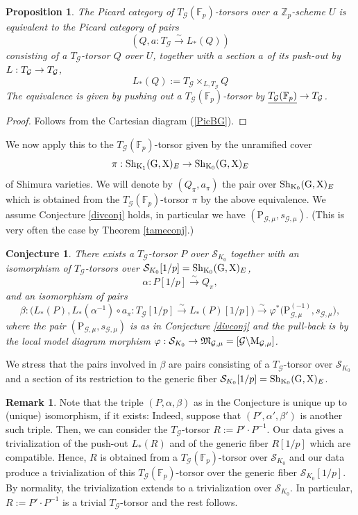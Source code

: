 \documentclass[reqno, 10pt]{amsart}
\makeatletter
\newcommand{\fkM}{\ensuremath{\mathfrak{M}}\xspace}
\newcommand{\BF}{\ensuremath{\mathbb {F}}\xspace}
\newcommand{\BZ}{\ensuremath{\mathbb {Z}}\xspace}
\newcommand{\CG}{\ensuremath{\mathcal {G}}\xspace}
\newcommand{\CS}{\ensuremath{\mathcal {S}}\xspace}
\newcommand{\RG}{\ensuremath{\mathrm {G}}\xspace}
\newcommand{\RK}{\ensuremath{\mathrm {K}}\xspace}
\newcommand{\RP}{\ensuremath{\mathrm {P}}\xspace}
\newcommand{\RX}{\ensuremath{\mathrm {X}}\xspace}
\newcommand{\bs}{\backslash}
\newtheorem{proposition}[subsubsection]{Proposition}
\newtheorem {conjecture}[subsubsection]{Conjecture}
\theoremstyle{definition}
\newtheorem{remark}[subsubsection]{Remark}
\numberwithin{equation}{subsection}
\numberwithin{subsubsection}{subsection}
\renewcommand{\to}{%
   \ifbool{@display}{\longrightarrow}{\rightarrow}%
   }
\newcommand{\und}{\underline}
\newcommand{\Mloc}{{\rm M}}
\makeatother
\begin{document}
 \begin{proposition}\label{prop:torsors}
 The Picard category of $T_\CG(\BF_p)$-torsors over a $\BZ_p$-scheme $U$ is equivalent to the Picard category of pairs 
 \[
 (Q, a: T_{\CG}\xrightarrow{\sim}  L_*(Q))
 \]
consisting of a $T_{\CG}$-torsor $Q$ over $U$, together with a section $a$ of its push-out by $L: T_{\CG}\to T_{\CG}$,
 \[
 L_*(Q):=T_{\CG}\times_{L, T_{\CG}}Q
 \]
The equivalence is given by pushing out a $T_\CG(\BF_p)$-torsor by $\und{T_\CG(\BF_p)}\to T_{\CG}$. 
\end{proposition}

\begin{proof}
Follows from the Cartesian diagram (\ref{PicBG}).
\end{proof}


We now apply this to the $T_\CG(\BF_p)$-torsor given by the unramified cover
  \[
 \pi: {\rm Sh}_{\RK_1 }(\RG, \RX)_E\to {\rm Sh}_{\RK_0}(\RG, \RX)_E
 \]
 of Shimura varieties. We will denote by $(Q_\pi, a_\pi)$ the pair over ${\rm Sh}_{\RK_0}(\RG, \RX)_E$ which is obtained  from the $T_\CG(\BF_p)$-torsor  $\pi$ by the above equivalence.  We assume Conjecture \ref{divconj} holds, in particular we have $(\RP_{\CG,\mu}, s_{\CG,\mu})$. (This is very often the case by Theorem \ref{tameconj}.)
  
 \begin{conjecture}\label{conj:torsors}
 There exists a $T_\CG$-torsor $P$ over $\CS_{K_0}$ together with an isomorphism of $T_\CG$-torsors over 
 $\CS_{K_0}[1/p]={\rm Sh}_{\RK_0}(\RG, \RX)_E$,
 \[
 \alpha: P[1/p]\xrightarrow{\sim} Q_\pi,
 \]
  and an isomorphism of pairs 
 \[
 \beta: \big(L_*(P), L_*(\alpha^{-1})\circ a_\pi: T_{\CG}[1/p]\xrightarrow{\sim} L_*(P)[1/p]\big)\xrightarrow{\sim} \varphi^*\big(\RP^{(-1)}_{\CG,\mu}, s_{\CG,\mu}\big),
 \]
 where the pair  $(\RP_{\CG,\mu}, s_{\CG,\mu})$ is as in Conjecture \ref{divconj} and the pull-back is by the local model diagram morphism $\varphi: \CS_{K_0}\to \fkM_{\CG,\mu}
 =[\CG\bs \Mloc_{\CG,\mu}]$.
 \end{conjecture}
 
We stress that the pairs involved in $\beta$ are pairs consisting of a $T_\CG$-torsor over $\CS_{K_0}$ and  a section of its restriction to the generic fiber $\CS_{K_0}[1/p]={\rm Sh}_{\RK_0}(\RG, \RX)_E$. 

\begin{remark}
Note that  the triple $(P,\alpha,\beta)$ as in the Conjecture is unique up to (unique) isomorphism, if it exists: Indeed, suppose that $(P',\alpha',\beta')$ is another such triple.
Then, we can consider the $T_\CG$-torsor $R:=P'\cdot P^{-1}$. Our data gives a trivialization of the push-out $L_*(R)$ and of the generic fiber $R[1/p]$ which are compatible. Hence, $R$ is obtained from a $T_\CG(\BF_p)$-torsor over $\CS_{K_0}$ and our data produce a trivialization of this $T_\CG(\BF_p)$-torsor over the generic fiber $\CS_{K_0}[1/p]$. By normality, the trivialization extends to a trivialization over $\CS_{K_0}$. In particular, $R:=P'\cdot P^{-1}$ is a trivial $T_\CG$-torsor and the rest follows.
 \end{remark}
 
\end{document}
